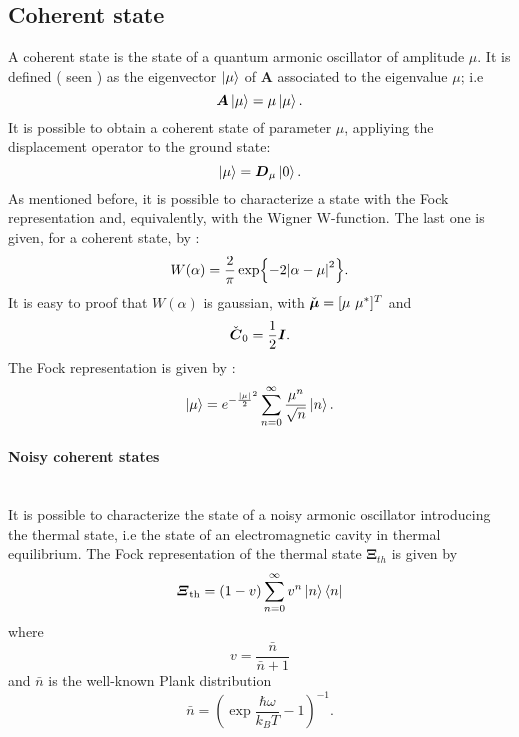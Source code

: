     \subsection{Coherent state}
        A coherent state is the state of a quantum armonic oscillator of amplitude $\mu$.
        It is defined (\cite{tesiGuerrini} seen \cite{CohSt_Glauber,CohSt_Glauber2}) as the eigenvector $\ket{\mu}$ of $\pmb{A}$ 
        associated to the eigenvalue $\mu$; i.e
        \begin{equation}
            \bm{\relax{A}}\ket{\mu}=\mu\ket{\mu}.
        \end{equation}
        It is possible to obtain a coherent state of parameter $\mu$, appliying the displacement
        operator to the ground state:
        \begin{equation}
            \ket{\mu}=\bm{\relax{D}}_\mu\ket{0}.
        \end{equation}
        As mentioned before, it is possible to characterize a state with the Fock representation
        and, equivalently, with the Wigner W-function. The last one is given, for a coherent state,
        by \cite{QuantumNoise}:
        \begin{equation}
            W(\alpha)=\frac{2}{\pi}\exp{-2\absolutevalue{\alpha-\mu}^2}.
            \label{eq:WignerCoh}
        \end{equation}
        It is easy to proof that $W(\alpha)$ is gaussian, with $\check{\Vector{\mu}}=[\mu\ \mu^*]^T$ and
        \begin{equation*}
            \check{\bm{\relax{C}}}_0=\frac{1}{2}\bm{\relax{I}}.
        \end{equation*} 
        The Fock representation is given by \cite{Dowling}:
        \begin{equation}
            \ket{\mu}=e^{-\frac{\absolutevalue{\mu}}{2}^2}\sum_{n=0}^{\infty}
            \frac{\mu^n}{\sqrt{n}}\ket{n}.
        \end{equation}

        \paragraph{Noisy coherent states}\mbox{} \\
        \label{par:NoisycohState}
        It is possible to characterize the state of a noisy armonic oscillator introducing
        the thermal state, i.e the state of an electromagnetic cavity in thermal equilibrium.
        The Fock representation of the thermal state $\pmb{\Xi}_{th}$ is given by \cite{tesiGuerrini}
        \begin{equation}
            \bm{\relax{\varXi}}_{\mathrm{th}}=(1-v)\sum_{n=0}^{\infty}v^n\ket{n}\bra{n}
        \end{equation}
        where
        \begin{equation*}
            v=\frac{\bar{n}}{\bar{n}+1}
        \end{equation*}
        and $\bar{n}$ is the well-known Plank distribution
        \begin{equation*}
            \bar{n}=\left(\exp{\frac{\hbar\omega}{k_B T}}-1\right)^{-1}.
            \label{eq:nbar}
        \end{equation*}

